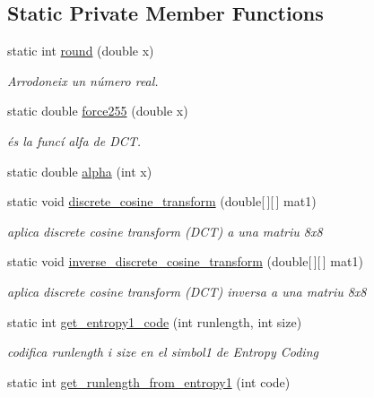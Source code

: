 \subsection*{Static Private Member Functions}
\begin{DoxyCompactItemize}
\item 
static int \hyperlink{classdomini_1_1algorithm_1_1JPEG_aa9c52789d61d5eebdeb13ee39f8e817d}{round} (double x)
\begin{DoxyCompactList}\small\item\em Arrodoneix un número real. \end{DoxyCompactList}\item 
static double \hyperlink{classdomini_1_1algorithm_1_1JPEG_af86bdbb6b6f5671abff6bc6bd5f6349d}{force255} (double x)
\begin{DoxyCompactList}\small\item\em és la funcí alfa de D\+CT. \end{DoxyCompactList}\item 
static double \hyperlink{classdomini_1_1algorithm_1_1JPEG_a058b0ee7eb44bbaec4078b5fc32c5107}{alpha} (int x)
\item 
static void \hyperlink{classdomini_1_1algorithm_1_1JPEG_a367e6d1e6543bf3d8c847aae36f4b6bf}{discrete\+\_\+cosine\+\_\+transform} (double\mbox{[}$\,$\mbox{]}\mbox{[}$\,$\mbox{]} mat1)
\begin{DoxyCompactList}\small\item\em aplica discrete cosine transform (D\+CT) a una matriu 8x8 \end{DoxyCompactList}\item 
static void \hyperlink{classdomini_1_1algorithm_1_1JPEG_a3a6e16b0ee34746e4b0118ed9107bd75}{inverse\+\_\+discrete\+\_\+cosine\+\_\+transform} (double\mbox{[}$\,$\mbox{]}\mbox{[}$\,$\mbox{]} mat1)
\begin{DoxyCompactList}\small\item\em aplica discrete cosine transform (D\+CT) inversa a una matriu 8x8 \end{DoxyCompactList}\item 
static int \hyperlink{classdomini_1_1algorithm_1_1JPEG_a0f897c6c525d81551539df1eb8db7e12}{get\+\_\+entropy1\+\_\+code} (int runlength, int size)
\begin{DoxyCompactList}\small\item\em codifica runlength i size en el simbol1 de Entropy Coding \end{DoxyCompactList}\item 
static int \hyperlink{classdomini_1_1algorithm_1_1JPEG_ac58cb434a7acfd90fc8e548fd7c00ae2}{get\+\_\+runlength\+\_\+from\+\_\+entropy1} (int code)

\end{DoxyCompactItemize}
